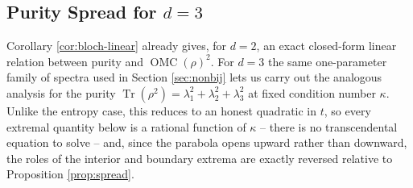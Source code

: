 \documentclass{article}
\theoremstyle{remark}
\providecommand{\QMC}{\operatorname{OMC}}
\begin{document}
\subsection{Purity Spread for $d=3$}\label{sec:purity-spread}

Corollary \ref{cor:bloch-linear} already gives, for $d=2$, an exact closed-form linear relation between purity and $\QMC(\rho)^2$. For $d=3$ the same one-parameter family of spectra used in Section \ref{sec:nonbij} lets us carry out the analogous analysis for the purity $\operatorname{Tr}(\rho^2)=\lambda_1^2+\lambda_2^2+\lambda_3^2$ at fixed condition number $\kappa$. Unlike the entropy case, this reduces to an honest quadratic in $t$, so every extremal quantity below is a rational function of $\kappa$ -- there is no transcendental equation to solve -- and, since the parabola opens upward rather than downward, the roles of the interior and boundary extrema are exactly reversed relative to Proposition \ref{prop:spread}.
\end{document}
